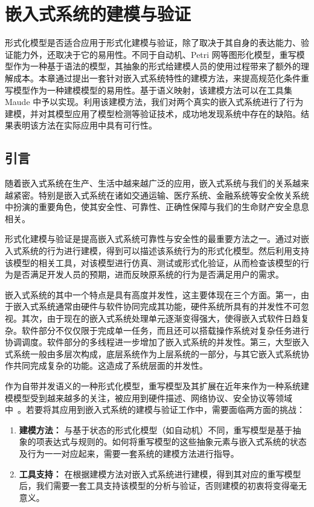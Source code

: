 \chapter{嵌入式系统的建模与验证}
\label{cha:modeling}

形式化模型是否适合应用于形式化建模与验证，除了取决于其自身的表达能力、验证能力外，还取决于它的易用性。不同于自动机、Petri 网等图形化模型，重写模型作为一种基于语法的模型，其抽象的形式给建模人员的使用过程带来了额外的理解成本。本章通过提出一套针对嵌入式系统特性的建模方法，来提高规范化条件重写模型作为一种建模模型的易用性。基于语义映射，该建模方法可以在工具集 Maude 中予以实现。利用该建模方法，我们对两个真实的嵌入式系统进行了行为建模，并对其模型应用了模型检测等验证技术，成功地发现系统中存在的缺陷。结果表明该方法在实际应用中具有可行性。

\section{引言}

随着嵌入式系统在生产、生活中越来越广泛的应用，嵌入式系统与我们的关系越来越紧密。特别是嵌入式系统在诸如交通运输、医疗系统、金融系统等安全攸关系统中扮演的重要角色，使其安全性、可靠性、正确性保障与我们的生命财产安全息息相关。

形式化建模与验证是提高嵌入式系统可靠性与安全性的最重要方法之一。通过对嵌入式系统的行为进行建模，得到可以描述该系统行为的形式化模型。然后利用支持该模型的相关工具，对该模型进行仿真、测试或形式化验证，从而检查该模型的行为是否满足开发人员的预期，进而反映原系统的行为是否满足用户的需求。

嵌入式系统的其中一个特点是具有高度并发性，这主要体现在三个方面。第一，由于嵌入式系统通常由硬件与软件协同完成其功能，硬件系统所具有的并发性不可忽视。其次，由于现在的嵌入式系统处理单元逐渐变得强大，使得嵌入式软件日趋复杂。软件部分不仅仅限于完成单一任务，而且还可以搭载操作系统对复杂任务进行协调调度。软件部分的多线程进一步增加了嵌入式系统的并发性。第三，大型嵌入式系统一般由多层次构成，底层系统作为上层系统的一部分，与其它嵌入式系统协作共同完成复杂的功能。这造成了系统层面的并发性。

作为自带并发语义的一种形式化模型，重写模型及其扩展在近年来作为一种系统建模模型受到越来越多的关注，被应用到硬件描述、网络协议、安全协议等领域中~\cite{DBLP:journals/jlp/Meseguer12,DBLP:journals/iandc/MeseguerR13}。若要将其应用到嵌入式系统的建模与验证工作中，需要面临两方面的挑战：
\begin{enumerate}
\item \textbf{建模方法：} 与基于状态的形式化模型（如自动机）不同，重写模型是基于抽象的项表达式与规则的。如何将重写模型的这些抽象元素与嵌入式系统的状态及行为一一对应起来，需要一套系统的建模方法进行指导。
\item \textbf{工具支持：} 在根据建模方法对嵌入式系统进行建模，得到其对应的重写模型后，我们需要一套工具支持该模型的分析与验证，否则建模的初衷将变得毫无意义。
\end{enumerate}

